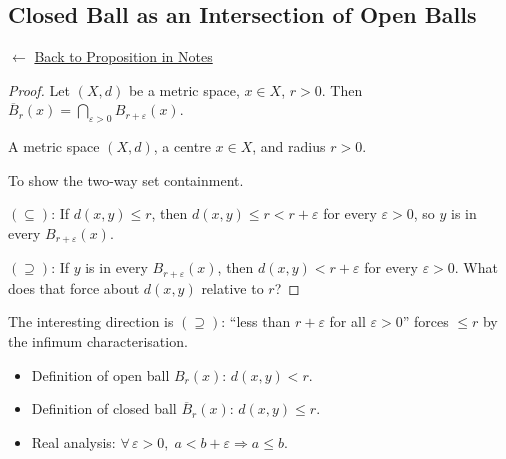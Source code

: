 
\subsection*{Closed Ball as an Intersection of Open Balls}
\label{prf:closed-as-int-open}

\begin{remark*}[Return]
$\leftarrow$ \hyperref[prop:closed-as-int-open]{Back to Proposition in Notes}
\end{remark*}

\begin{proof}
\Claim Let $(X,d)$ be a metric space, $x \in X$, $r > 0$.
Then $\overline{B}_r(x) = \bigcap_{\varepsilon > 0} B_{r+\varepsilon}(x)$.

\Given A metric space $(X,d)$, a centre $x \in X$, and radius $r > 0$.

\Goal To show the two-way set containment.

\Strategy
$(\subseteq)$: If $d(x,y) \le r$, then $d(x,y) \le r < r + \varepsilon$
for every $\varepsilon > 0$, so $y$ is in every $B_{r+\varepsilon}(x)$.

$(\supseteq)$: If $y$ is in every $B_{r+\varepsilon}(x)$, then
$d(x,y) < r + \varepsilon$ for every $\varepsilon > 0$.
What does that force about $d(x,y)$ relative to $r$?


\end{proof}

\begin{remark*}
The interesting direction is $(\supseteq)$: ``less than $r+\varepsilon$ for
all $\varepsilon > 0$'' forces $\le r$ by the infimum characterisation.
\end{remark*}

\begin{remark*}[Dependencies]
\begin{itemize}
  \item Definition of open ball $B_r(x)$: $d(x,y) < r$.
  \item Definition of closed ball $\overline{B}_r(x)$: $d(x,y) \le r$.
  \item Real analysis: $\forall\,\varepsilon > 0,\; a < b + \varepsilon \Rightarrow a \le b$.
\end{itemize}
\end{remark*}
